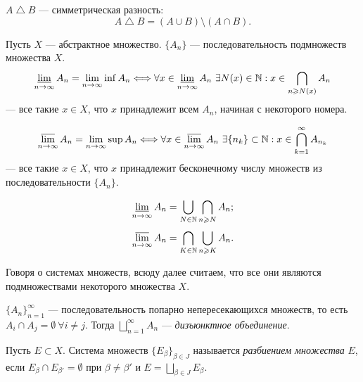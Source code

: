 \begin{definition}
    $A \bigtriangleup B$ — симметрическая разность:
    \[A \bigtriangleup B = (A \cup B) \setminus (A \cap B).\]
\end{definition} 

\begin{definition}
    Пусть $X$ — абстрактное множество. $\{ A_n \}$ — последовательность подмножеств множества $X$.
    \[\operatorname*{\underline{lim}}\limits_{n \to \infty} A_n = \lim\limits_{n \to \infty} \inf A_n \Longleftrightarrow \forall x \in \operatorname*{\underline{lim}}\limits_{n \to \infty} A_n \ \exists N(x) \in \mathbb{N}: x \in \bigcap\limits_{n \geqslant N(x)} A_n\]
    — все такие $x \in X$, что $x$ принадлежит всем $A_n$, начиная с некоторого номера.
\end{definition} 

\begin{definition}
    \[\operatorname*{\overline{lim}}\limits_{n \to \infty} A_n = \lim\limits_{n \to \infty} \sup A_n \Longleftrightarrow \forall x \in \operatorname*{\overline{lim}}\limits_{n \to \infty} A_n \ \exists \{n_k\} \subset \mathbb{N}: x \in \bigcap\limits_{k = 1}^{\infty} A_{n_k}\]
    — все такие $x \in X$, что $x$ принадлежит бесконечному числу множеств из последовательности $\{ A_n \}$.
\end{definition} 

\begin{lemma}
    \[ \operatorname*{\underline{lim}}\limits_{n \to \infty} A_n = \bigcup\limits_{N \in \mathbb{N}} \bigcap\limits_{n \geqslant N} A_n;\]
    \[ \operatorname*{\overline{lim}}\limits_{n \to \infty} A_n = \bigcap\limits_{K \in \mathbb{N}} \bigcup\limits_{n \geqslant K} A_n.\]
\end{lemma} 

\begin{remark}
    Говоря о системах множеств, всюду далее считаем, что все они являются подмножествами некоторого множества $X$.
\end{remark}

\begin{definition}
    $\{A_n\}_{n = 1}^{\infty}$ — последовательность попарно непересекающихся множеств, то есть $A_i \cap A_j = \emptyset \ \forall i \neq j$. Тогда $\bigsqcup \limits_{n = 1}^{\infty} A_n$ — \textit{дизъюнктное объединение}.
\end{definition} 

\begin{definition}
    Пусть $E \subset X$. Система множеств $\{E_{\beta}\}_{\beta \in J}$ называется \textit{разбиением множества} $E$, если $E_{\beta} \cap E_{\beta'} = \emptyset$ при $\beta \neq \beta'$ и $E = \bigsqcup\limits_{\beta \in J} E_{\beta}$.
\end{definition} 


